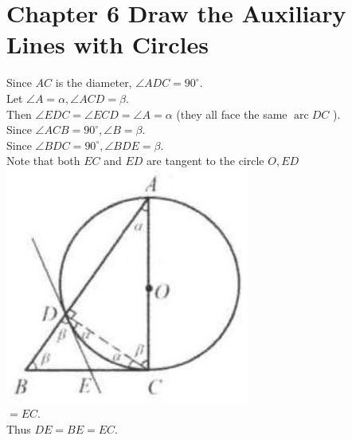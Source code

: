 \documentclass[10pt]{article}
\begin{document}
\section*{Chapter 6 Draw the Auxiliary Lines with Circles}
Since \(A C\) is the diameter, \(\angle A D C=90^{\circ}\).\\
Let \(\angle A=\alpha, \angle A C D=\beta\).\\
Then \(\angle E D C=\angle E C D=\angle A=\alpha\) (they all face the same \(\operatorname{arc} D C\) ).\\
Since \(\angle A C B=90^{\circ}, \angle B=\beta\).\\
Since \(\angle B D C=90^{\circ}, \angle B D E=\beta\).\\
Note that both \(E C\) and \(E D\) are tangent to the circle \(O, E D\)\\
\includegraphics[max width=\textwidth, center]{2025_04_17_97bc1f7e44d93c271a88g-172(2)}\\
\(=E C\).\\
Thus \(D E=B E=E C\).
\end{document}
